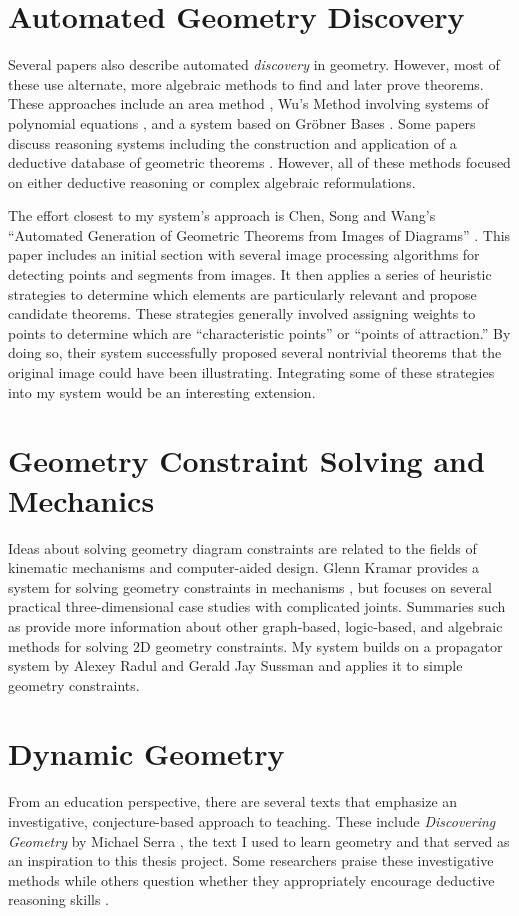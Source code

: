 \section{Automated Geometry Discovery}
Several papers also describe automated \emph{discovery} in
geometry. However, most of these use alternate, more algebraic methods
to find and later prove theorems.  These approaches include an area
method \cite{autoTools}, Wu's Method involving systems of polynomial
equations \cite{wuMethod}, and a system based on Gr\"obner Bases
\cite{grobner}.  Some papers discuss reasoning systems including the
construction and application of a deductive database of geometric
theorems \cite{deductiveDatabase}.  However, all of these methods
focused on either deductive reasoning or complex algebraic
reformulations.

The effort closest to my system's approach is Chen, Song and Wang's
``Automated Generation of Geometric Theorems from Images of Diagrams''
\cite{fromImages}. This paper includes an initial section with several
image processing algorithms for detecting points and segments from
images. It then applies a series of heuristic strategies to determine
which elements are particularly relevant and propose candidate
theorems. These strategies generally involved assigning weights to
points to determine which are ``characteristic points'' or ``points of
attraction.'' By doing so, their system successfully proposed several
nontrivial theorems that the original image could have been
illustrating.  Integrating some of these strategies into my system
would be an interesting extension.

\section{Geometry Constraint Solving and Mechanics}

Ideas about solving geometry diagram constraints are related to the
fields of kinematic mechanisms and computer-aided design. Glenn
Kramar provides a system for solving geometry constraints in
mechanisms \cite{kramer1992solving}, but focuses on several practical
three-dimensional case studies with complicated joints. Summaries such
as \cite{joan2009basics} provide more information about other
graph-based, logic-based, and algebraic methods for solving 2D
geometry constraints. My system builds on a propagator system by
Alexey Radul and Gerald Jay Sussman \cite{radul-propagator} and
applies it to simple geometry constraints.

\section{Dynamic Geometry}
From an education perspective, there are several texts that emphasize
an investigative, conjecture-based approach to teaching. These include
\emph{Discovering Geometry} by Michael Serra \cite{serraDiscovering},
the text I used to learn geometry and that served as an inspiration to
this thesis project.  Some researchers praise these investigative
methods \cite{geoTransformations} while others question whether they
appropriately encourage deductive reasoning skills \cite{geoTeaching}.

